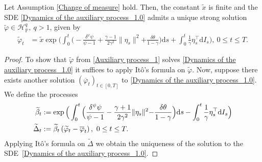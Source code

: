 \documentclass[10pt,a4paper]{amsart}
\begin{document}
\begin{lemm}\label{Solution to the auxiliary SDE}
	Let Assumption \ref{Change of measure} hold. Then, the constant $\widetilde{x}$ is finite and the SDE \eqref{Dynamics of the auxiliary process_1.0} admits a unique strong solution $\widetilde{\varphi}\in\mathcal{H}_{\mathbb{P}}^{q},~q>1$, given by
	\begin{align}\label{Auxiliary process_1}
		\widetilde{\varphi}_{t}&=\widetilde{x}\exp\Big(\int_{0}^{t}\Big(-\frac{\delta^{\psi}\psi}{\psi-1}+\frac{\gamma-1}{2\gamma^{2}}\|\eta_{s}\|^{2}{+\frac{\delta\theta}{1-\gamma}}\Big)\mathrm{d}s+\int_{0}^{t}\frac{1}{\gamma}\eta_{s}^{\top}\mathrm{d}I_{s}\Big),~0\le t\le T.
	\end{align}
\end{lemm}

\begin{proof}
	To show that $\widetilde{\varphi}$ from \eqref{Auxiliary process_1} solves \eqref{Dynamics of the auxiliary process_1.0} it suffices to apply It{\^o}'s formula on $\widetilde{\varphi}$. Now, suppose there exists another solution $(\overline{\varphi}_{t})_{t\in[0,T]}$ to \eqref{Dynamics of the auxiliary process_1.0}. We define the processes
	\begin{align*}
		\widetilde{\beta}_{t}&:=\exp\Big(\int_{0}^{t}\Big(\frac{\delta^{\psi}\psi}{\psi-1}-\frac{\gamma+1}{2\gamma^{2}}\|\eta_{s}\|^{2}{-\frac{\delta\theta}{1-\gamma}}\Big)\mathrm{d}s -\int_{0}^{t}\frac{1}{\gamma}\eta_{s}^{\top}\mathrm{d}I_{s}\Big)\notag\\
		\widetilde{\Delta}_{t}&:=\widetilde{\beta}_{t}\left(\widetilde{\varphi}_{t}-\overline{\varphi}_{t}\right),~0\le t\le T.
	\end{align*}
	Applying It{\^o}'s formula on $\widetilde{\Delta}$ we obtain the uniqueness of the solution to the SDE~\eqref{Dynamics of the auxiliary process_1.0}.
	

\end{proof}
\end{document}

